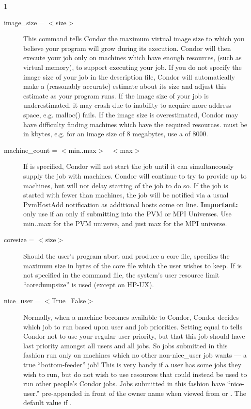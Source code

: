 \begin{ManPage}{\label{man-condor-submit}}{1}
\begin{description}
\item[image\_size = $<$size$>$] This command tells Condor the maximum
virtual image size to which you believe your program will grow during
its execution. Condor will then execute your job only on machines which
have enough resources, (such as virtual memory), to support executing
your job. If you do not specify the image size of your job in the
description file, Condor will automatically make a (reasonably accurate)
estimate about its size and adjust this estimate as your program runs.
If the image size of your job is underestimated, it may crash due to
inability to acquire more address space, e.g. malloc() fails. If the image
size is overestimated, Condor may have difficulty finding machines which
have the required resources.  must be in kbytes, e.g. for
an image size of 8 megabytes, use a  of 8000.


\item[machine\_count = $<$min..max$>$ \Bar\ $<$max$>$] 
If  is
specified, Condor will not start the job until it can simultaneously
supply the job with  machines.  Condor will continue to try 
to provide up
to  machines, but will not delay starting of the job to do so.
If the job is started with fewer than  machines, the job
will be notified via a usual PvmHostAdd notification as additional
hosts come on line.
\textbf{Important:} only use  if an only if
submitting into the PVM or MPI Universes.  Use min..max for the PVM
universe, and just max for the MPI universe.


\item[coresize = $<$size$>$] Should the user's program abort and produce
a core file,  specifies the maximum size in bytes of the
core file which the user wishes to keep. If  is not
specified in the command file, the system's user resource limit
\mbox{``coredumpsize''} is used (except on HP-UX). 


\item[nice\_user = $<$True \Bar\ False$>$] \label{man-condor-submit-nice}Normally, when a machine
becomes available to Condor, Condor decides which job to run based upon
user and job priorities. Setting  equal to 
tells Condor not to use your regular user priority, but that this job
should have last priority amongst all users and all jobs. So jobs
submitted in this fashion run only on machines which no other
non-nice\_user job wants --- a true ``bottom-feeder'' job! This is very
handy if a user has some jobs they wish to run, but do not wish to use
resources that could instead be used to run other people's Condor jobs. Jobs
submitted in this fashion have ``nice-user.'' pre-appended in front of
the owner name when viewed from  or .  The
default value if .


\end{description}
\end{ManPage}

